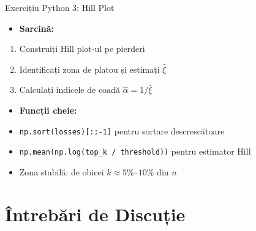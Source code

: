 \documentclass[9pt, aspectratio=169, t]{beamer}
\begin{document}
\begin{frame}[fragile]{Exercițiu Python 3: Hill Plot}
    \begin{itemize}\setlength{\itemsep}{0pt}
        \item \textbf{Sarcină:}
    \end{itemize}
    \begin{enumerate}\setlength{\itemsep}{0pt}
        \item Construiți Hill plot-ul pe pierderi
        \item Identificați zona de platou și estimați $\hat{\xi}$
        \item Calculați indicele de coadă $\hat{\alpha} = 1/\hat{\xi}$
    \end{enumerate}

    \vspace{0.3cm}
    \begin{itemize}\setlength{\itemsep}{0pt}
        \item \textbf{Funcții cheie:}
    \end{itemize}
    \begin{itemize}\setlength{\itemsep}{0pt}
        \item \texttt{np.sort(losses)[::-1]} pentru sortare descrescătoare
        \item \texttt{np.mean(np.log(top\_k / threshold))} pentru estimator Hill
        \item Zona stabilă: de obicei $k \approx 5\%$--$10\%$ din $n$
    \end{itemize}

\end{frame}

\section{Întrebări de Discuție}
\end{document}
